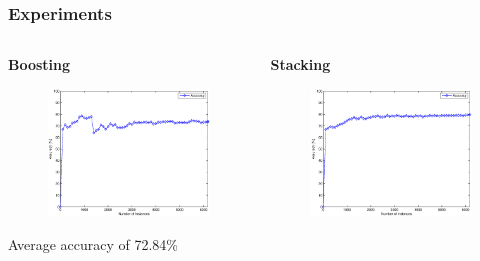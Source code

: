 \documentclass{beamer}
\begin{document}
    \begin{frame}
        \frametitle{Experiments}
        \begin{columns}
            \begin{column}{0.5\textwidth}
                \begin{center}
                    \textbf{Boosting}
                \end{center}
                \begin{figure}
                    \centering
                    \includegraphics[width=\textwidth]{figures/boosting_accuracy.eps}
                \end{figure}
                \begin{center}
                    Average accuracy of 72.84\%
                \end{center}
            \end{column}
            \begin{column}{0.5\textwidth}
                \begin{center}
                    \textbf{Stacking}
                \end{center}
                \begin{figure}
                    \centering
                    \includegraphics[width=\textwidth]{figures/stacking_accuracy.eps}

\end{figure}
\end{column}
\end{columns}
\end{frame}
\end{document}

